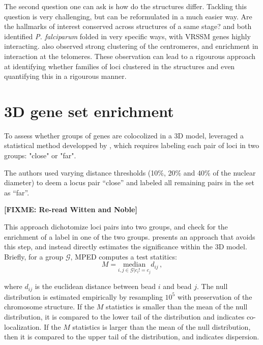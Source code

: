 \documentclass[letterpaper,12pt]{article}
\newcommand{\fixme}[1]{\textbf{[FIXME: #1]}}
\begin{document}
The second question one can ask is how do the structures differ. Tackling this
question is very challenging, but can be reformulated in a much easier way.
Are the hallmarks of interest conserved across structures of a same stage?
\citet{ay:three-dimensional} and \citet{lemieux:genome-wide} both identified
{\em P. falciparum} folded in very specific ways, with VRSSM genes highly
interacting. \citet{ay:three-dimensional} also observed strong clustering of
the centromeres, and enrichment in interaction at the telomeres. These
observation can lead to a rigourous approach at identifying whether families
of loci clustered in the structures and even quantifying this in a rigourous
manner.

\section{3D gene set enrichment}

To assess whether groups of genes are colocolized in a 3D model,
\citet{ay:three-dimensional} leveraged a statistical method developped by
\citet{witten:XXX}, which requires labeling each pair of loci in two groups:
"close" or "far". 

The authors used varying distance
thresholds (10\%, 20\% and 40\% of the nuclear diameter) to deem a locus pair
“close” and labeled all remaining
pairs in the set as “far”. 

\fixme{Re-read Witten and Noble}

This approach dichotomize loci pairs into two groups, and check for the
enrichment of a label in one of the two groups. \citep{capurso:distance-based}
presents an approach that avoids this step, and instead directly estimates the
significance within the 3D model. Briefly, for a group $\mathcal{G}$, MPED
computes a test statitics:
\begin{equation*}
M = \underset{i,j \in \mathcal{G}| c_i != c_j}{\text{median}} d_{ij}\,,
\end{equation*}

where $d_{ij}$ is the euclidean distance between bead $i$ and bead $j$. The
null distribution is estimated empirically by resampling $10^5$ with
preservation of the chromosome structure. If the $M$ statistics is smaller
than the mean of the null distribution, it is compared to the lower tail of
the distribution and indicates co-localization. If the $M$ statistics is
larger than the mean of the null distribution, then it is compared to the
upper tail of the distribution, and indicates dispersion.
\end{document}
